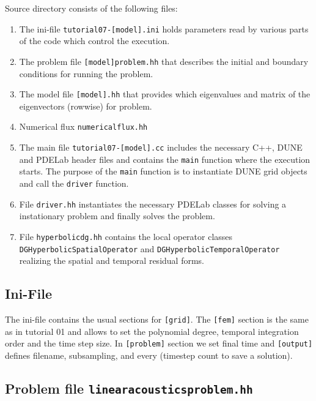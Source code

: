 \documentclass[a4paper,12pt]{article}
\theoremstyle{definition}
\theoremstyle{definition}
\begin{document}
Source directory consists of the following files:
\begin{enumerate}[1)]
	\item The ini-file
	\lstinline{tutorial07-[model].ini} holds parameters read by various parts of the code
	which control the execution.
	\item The problem file \lstinline{[model]problem.hh} that describes the initial and boundary conditions for running the problem.
	\item The model file \lstinline{[model].hh} that provides  which eigenvalues and matrix  of the eigenvectors (rowwise) for problem.
	\item Numerical flux \lstinline{numericalflux.hh}
	\item The main file \lstinline{tutorial07-[model].cc} includes the necessary C++,
	DUNE and PDELab header files
	and contains the \lstinline{main} function where the execution starts.
	The purpose of the \lstinline{main} function is
	to instantiate DUNE grid objects and call the \lstinline{driver} function.
	\item File \lstinline{driver.hh} instantiates the necessary PDELab classes
	for solving a instationary problem and finally solves the problem.
	\item File \lstinline{hyperbolicdg.hh} contains the local operator classes \\
	\lstinline{DGHyperbolicSpatialOperator} and
	\lstinline{DGHyperbolicTemporalOperator} realizing the spatial
	and temporal residual forms.

\end{enumerate}


\subsection{Ini-File}

The ini-file contains the usual sections for \lstinline{[grid]}. The
\lstinline{[fem]} section is the same as in tutorial 01 and allows to set
the polynomial degree, temporal integration order and the time step size. In \lstinline{[problem]} section we set final time and \lstinline{[output]} defines filename,
subsampling, and every (timestep count to save a solution).



\subsection{Problem file \lstinline{linearacousticsproblem.hh}}
\end{document}
